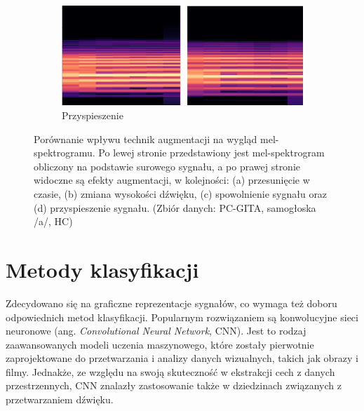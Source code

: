 \begin{figure}[ht]
    \begin{subfigure}{0.68\textwidth}
        \includegraphics[width=\linewidth]{./img/augmentation/speed}
        \caption{Przyspieszenie\@}
        \label{fig:speed}
    \end{subfigure}

    \caption{Porównanie wpływu technik augmentacji na wygląd mel-spektrogramu. Po lewej stronie przedstawiony jest mel-spektrogram obliczony na podstawie surowego sygnału, a po prawej stronie widoczne są efekty augmentacji, w kolejności: (a) przesunięcie w czasie, (b) zmiana wysokości dźwięku, (c) spowolnienie sygnału oraz (d) przyspieszenie sygnału. (Zbiór danych: PC-GITA, samogłoska /a/, HC)}

    \label{fig:augumentacja}
\end{figure}

\section{Metody klasyfikacji}
\label{sec:klasyfikacja}

Zdecydowano się na graficzne reprezentacje sygnałów, co wymaga też doboru odpowiednich metod klasyfikacji.
Popularnym rozwiązaniem są konwolucyjne sieci neuronowe (ang. \emph{Convolutional Neural Network}, CNN).
Jest to rodzaj zaawansowanych modeli uczenia maszynowego, które zostały pierwotnie zaprojektowane do przetwarzania i analizy danych wizualnych, takich jak obrazy i filmy.
Jednakże, ze względu na swoją skuteczność w ekstrakcji cech z danych przestrzennych, CNN znalazły zastosowanie także w dziedzinach związanych z przetwarzaniem dźwięku.

